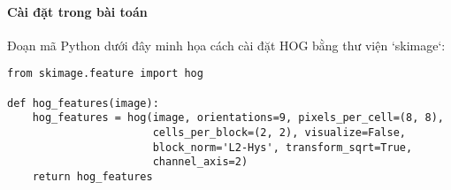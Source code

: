 \documentclass[a4paper,12pt]{article}
\begin{document}
\paragraph{Cài đặt trong bài toán}
\hspace{5mm}Đoạn mã Python dưới đây minh họa cách cài đặt HOG bằng thư viện `skimage`:

\begin{verbatim}
from skimage.feature import hog

def hog_features(image):
    hog_features = hog(image, orientations=9, pixels_per_cell=(8, 8), 
                       cells_per_block=(2, 2), visualize=False, 
                       block_norm='L2-Hys', transform_sqrt=True, 
                       channel_axis=2)
    return hog_features
\end{verbatim}
\end{document}
